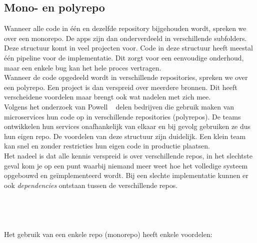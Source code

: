 \newpage
\subsection{Mono- en polyrepo}
Wanneer alle code in één en dezelfde repository bijgehouden wordt, spreken we over een monorepo. De apps zijn dan onderverdeeld in verschillende subfolders. Deze structuur komt in veel projecten voor. Code in deze structuur heeft meestal één pipeline voor de implementatie. Dit zorgt voor een eenvoudige onderhoud, maar een enkele bug kan het hele proces vertragen.\\ 
Wanneer de code opgedeeld wordt in verschillende repositories, spreken we over een polyrepo. Een project is dan verspreid over meerdere bronnen. Dit heeft verscheidene voordelen maar brengt ook wat nadelen met zich mee.\\
Volgens het onderzoek van Powell ~\autocite{Powell2021} delen bedrijven die gebruik maken van microservices hun code op in verschillende repositories (polyrepos). De teams ontwikkelen hun services onafhankelijk van elkaar en bij gevolg gebruiken ze dus hun eigen repo. De voordelen van deze structuur zijn duidelijk. Een klein team kan snel en zonder restricties hun eigen code in productie plaatsen.\\  
Het nadeel is dat alle kennis verspreid is over verschillende repos, in het slechtste geval kom je op een punt waarbij niemand meer weet hoe het volledige systeem opgebouwd en geïmplementeerd wordt. Bij een slechte implementatie kunnen er ook \emph{dependencies} ontstaan tussen de verschillende repos. \\
\\
\\
\\
\\
Het gebruik van een enkele repo (monorepo) heeft enkele voordelen:
